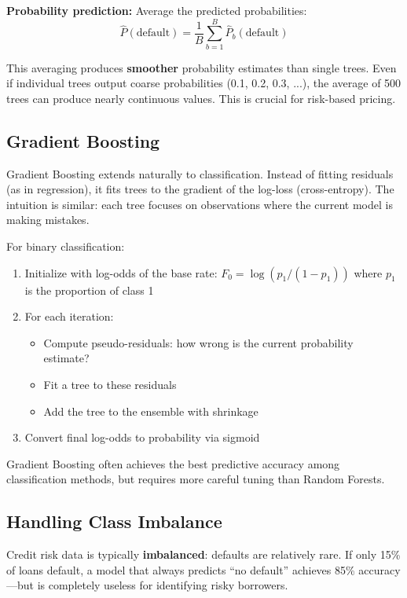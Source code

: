 \documentclass[11pt,a4paper]{article}
\newcommand{\keyword}[1]{\textbf{\textcolor{AccentOrange}{#1}}}
\begin{document}
\textbf{Probability prediction:} Average the predicted probabilities:
\[
\widehat{P}(\text{default}) = \frac{1}{B} \sum_{b=1}^{B} \widehat{P}_b(\text{default})
\]

This averaging produces \keyword{smoother} probability estimates than single trees. Even if individual trees output coarse probabilities (0.1, 0.2, 0.3, ...), the average of 500 trees can produce nearly continuous values. This is crucial for risk-based pricing.

\subsection{Gradient Boosting}

Gradient Boosting extends naturally to classification. Instead of fitting residuals (as in regression), it fits trees to the gradient of the log-loss (cross-entropy). The intuition is similar: each tree focuses on observations where the current model is making mistakes.

For binary classification:
\begin{enumerate}
    \item Initialize with log-odds of the base rate: $F_0 = \log(p_1 / (1-p_1))$ where $p_1$ is the proportion of class 1
    \item For each iteration:
    \begin{itemize}
        \item Compute pseudo-residuals: how wrong is the current probability estimate?
        \item Fit a tree to these residuals
        \item Add the tree to the ensemble with shrinkage
    \end{itemize}
    \item Convert final log-odds to probability via sigmoid
\end{enumerate}

Gradient Boosting often achieves the best predictive accuracy among classification methods, but requires more careful tuning than Random Forests.

\subsection{Handling Class Imbalance}

Credit risk data is typically \keyword{imbalanced}: defaults are relatively rare. If only 15\% of loans default, a model that always predicts ``no default'' achieves 85\% accuracy---but is completely useless for identifying risky borrowers.
\end{document}
